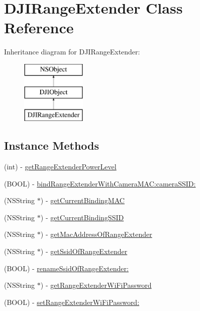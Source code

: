\hypertarget{interface_d_j_i_range_extender}{\section{D\+J\+I\+Range\+Extender Class Reference}
\label{interface_d_j_i_range_extender}
}
Inheritance diagram for D\+J\+I\+Range\+Extender\+:\begin{figure}[H]
\begin{center}
\leavevmode
\includegraphics[height=3.000000cm]{interface_d_j_i_range_extender}
\end{center}
\end{figure}
\subsection*{Instance Methods}
\begin{DoxyCompactItemize}
\item 
(int) -\/ \hyperlink{interface_d_j_i_range_extender_a7f37090359acfe02e298062499fc7546}{get\+Range\+Extender\+Power\+Level}
\item 
(B\+O\+O\+L) -\/ \hyperlink{interface_d_j_i_range_extender_aa41f3aaa0e748133963e6d2218442d12}{bind\+Range\+Extender\+With\+Camera\+M\+A\+C\+:camera\+S\+S\+I\+D\+:}
\item 
(N\+S\+String $\ast$) -\/ \hyperlink{interface_d_j_i_range_extender_a0635cd78ebfa3c1c37a1c76f4e909c42}{get\+Current\+Binding\+M\+A\+C}
\item 
(N\+S\+String $\ast$) -\/ \hyperlink{interface_d_j_i_range_extender_afbc8f1859cd7b83bb38270315e9c6fab}{get\+Current\+Binding\+S\+S\+I\+D}
\item 
(N\+S\+String $\ast$) -\/ \hyperlink{interface_d_j_i_range_extender_a8e2824ec831b529771fccedc6a50df4c}{get\+Mac\+Address\+Of\+Range\+Extender}
\item 
(N\+S\+String $\ast$) -\/ \hyperlink{interface_d_j_i_range_extender_a816a8dcd993c99f4fd54b5e59b893c83}{get\+Ssid\+Of\+Range\+Extender}
\item 
(B\+O\+O\+L) -\/ \hyperlink{interface_d_j_i_range_extender_afab6f3806396e27c74a3375b49c5fdf5}{rename\+Ssid\+Of\+Range\+Extender\+:}
\item 
(N\+S\+String $\ast$) -\/ \hyperlink{interface_d_j_i_range_extender_ad34805f00181d4a3e3dba96214f62fd8}{get\+Range\+Extender\+Wi\+Fi\+Password}
\item 
(B\+O\+O\+L) -\/ \hyperlink{interface_d_j_i_range_extender_aab8f7692b11f4e279542aa0890003131}{set\+Range\+Extender\+Wi\+Fi\+Password\+:}
\end{DoxyCompactItemize}



